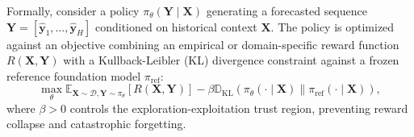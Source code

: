 Formally, consider a policy $\pi_\theta(\mathbf{Y} \mid \mathbf{X})$ generating a forecasted sequence $\mathbf{Y} = [\hat{\mathbf{y}}_1, \dots, \hat{\mathbf{y}}_H]$ conditioned on historical context $\mathbf{X}$. The policy is optimized against an objective combining an empirical or domain-specific reward function $R(\mathbf{X}, \mathbf{Y})$ with a Kullback-Leibler (KL) divergence constraint against a frozen reference foundation model $\pi_{\text{ref}}$:
\begin{equation}
    \max_\theta \mathbb{E}_{\mathbf{X} \sim \mathcal{D}, \mathbf{Y} \sim \pi_\theta}\left[ R(\mathbf{X}, \mathbf{Y}) \right] - \beta \mathbb{D}_{\text{KL}}\left(\pi_\theta(\cdot \mid \mathbf{X}) \parallel \pi_{\text{ref}}(\cdot \mid \mathbf{X})\right),
\end{equation}
where $\beta > 0$ controls the exploration-exploitation trust region, preventing reward collapse and catastrophic forgetting.

